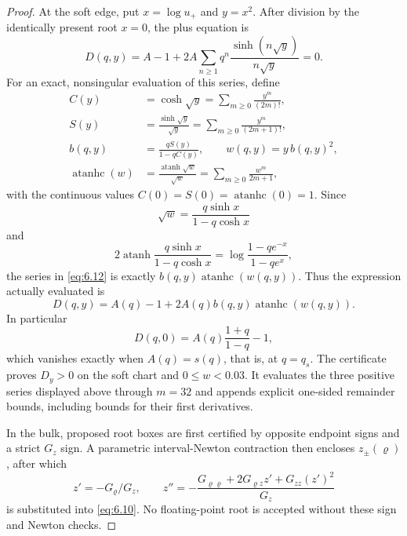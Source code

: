 \documentclass[11pt]{article}
\numberwithin{equation}{section}
\theoremstyle{plain}
\theoremstyle{definition}
\theoremstyle{remark}
\newcommand{\1}{\mathbf 1}
\begin{document}
\begin{proof}
At the soft edge, put $x=\log u_+$ and $y=x^2$.  After division by the
identically present root $x=0$, the plus equation is
\begin{equation}
 D(q,y)=A-1+2A\sum_{n\ge1}q^n
 \frac{\sinh(n\sqrt y)}{n\sqrt y}=0.
\label{eq:6.12}
\end{equation}
For an exact, nonsingular evaluation of this series, define
\[
\begin{aligned}
 C(y)&=\cosh\sqrt y=\sum_{m\ge0}\frac{y^m}{(2m)!},\\
 S(y)&=\frac{\sinh\sqrt y}{\sqrt y}
       =\sum_{m\ge0}\frac{y^m}{(2m+1)!},\\
 b(q,y)&=\frac{qS(y)}{1-qC(y)},\qquad
 w(q,y)=y\,b(q,y)^2,\\
 \operatorname{atanhc}(w)&=\frac{\operatorname{atanh}\sqrt w}{\sqrt w}
       =\sum_{m\ge0}\frac{w^m}{2m+1},
\end{aligned}
\]
with the continuous values
$C(0)=S(0)=\operatorname{atanhc}(0)=1$.  Since
\[
 \sqrt w=\frac{q\sinh x}{1-q\cosh x}
\]
and
\[
 2\operatorname{atanh}\frac{q\sinh x}{1-q\cosh x}
 =\log\frac{1-qe^{-x}}{1-qe^x},
\]
the series in \eqref{eq:6.12} is exactly
$b(q,y)\operatorname{atanhc}(w(q,y))$.  Thus the expression
actually evaluated is
\begin{equation}
 D(q,y)=A(q)-1+2A(q)b(q,y)\operatorname{atanhc}(w(q,y)).
\label{eq:6.12b}
\end{equation}
In particular
\[
 D(q,0)=A(q)\frac{1+q}{1-q}-1,
\]
which vanishes exactly when $A(q)=s(q)$, that is, at $q=q_s$.  The
certificate proves $D_y>0$ on the soft chart and $0\le w<0.03$.  It
evaluates the three positive series displayed above through $m=32$ and appends
explicit one-sided remainder bounds, including bounds for their first
derivatives.

In the bulk, proposed root boxes are first certified by opposite endpoint
signs and a strict $G_z$ sign.  A parametric interval-Newton contraction
then encloses $z_\pm(\varrho)$, after which
\[
 z'=-G_\varrho/G_z,\qquad
 z''=-\frac{G_{\varrho\varrho}+2G_{\varrho z}z'+G_{zz}(z')^2}{G_z}
\]
is substituted into \eqref{eq:6.10}.  No floating-point root is accepted without
these sign and Newton checks.


\end{proof}
\end{document}
